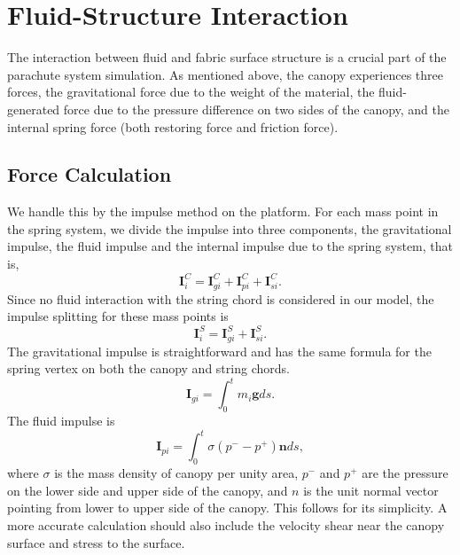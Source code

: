 \section{Fluid-Structure Interaction}
\label{Sec:FSI}
The interaction between fluid and fabric surface structure is a crucial part 
of the parachute system simulation. 
As mentioned above, the canopy experiences three forces, the gravitational 
force due to the weight of the material, the fluid-generated force due to 
the pressure difference on two sides of the canopy, and the internal spring 
force (both restoring force and friction force). 

\subsection{Force Calculation}
We handle this by the impulse method \cite{KimLiLi12} on the \FronTierp 
platform. 
For each mass point in the spring system, we divide the impulse into three 
components, the gravitational impulse, the fluid impulse and the internal 
impulse due to the spring system, that is, 
\begin{equation}
\mathbf{I}_i^C = \mathbf{I}_{gi}^C + \mathbf{I}_{pi}^C + \mathbf{I}_{si}^C.
\end{equation}
Since no fluid interaction with the string chord is considered in our model, 
the impulse splitting for these mass points is 
\begin{equation}
\mathbf{I}_i^S = \mathbf{I}_{gi}^S + \mathbf{I}_{si}^S.
\end{equation}
The gravitational impulse is straightforward and has the same formula for 
the spring vertex on both the canopy and string chords. 
\begin{equation}
\mathbf{I}_{gi} = \int_{0}^{t} m_{i} \mathbf{g} ds.
\end{equation}
The fluid impulse is 
\begin{equation}
\mathbf{I}_{pi} = \int_{0}^{t} \sigma (p^{-} - p^{+}) \mathbf{n} ds, 
\end{equation}
where $\sigma$ is the mass density of canopy per unity area, $p^{-}$ and 
$p^{+}$ are the pressure on the lower side and upper side of the canopy, 
and $n$ is the unit normal vector pointing from lower to upper side of the 
canopy. 
This follows \cite{Kalro00} for its simplicity. 
A more accurate calculation should also include the velocity shear near the 
canopy surface and stress to the surface. 

